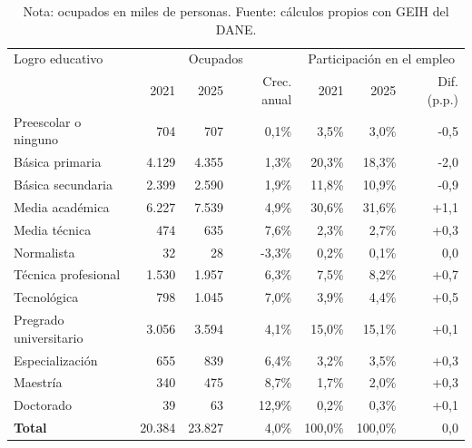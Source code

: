 \begin{table}[H]
\centering
\caption{Ocupación por logro educativo detallado, 2021 y 2025}
\label{tab:ocupacion_educacion_detallada}
\scriptsize
\setlength{\tabcolsep}{3pt}
\begin{tabular}{@{}p{3.7cm}rrrrrr@{}}
\toprule
Logro educativo & \multicolumn{3}{c}{Ocupados} & \multicolumn{3}{c}{Participación en el empleo} \\
 & 2021 & 2025 & Crec. anual & 2021 & 2025 & Dif. (p.p.) \\
\midrule
Preescolar o ninguno & 704 & 707 & 0,1\% & 3,5\% & 3,0\% & -0,5 \\
Básica primaria & 4.129 & 4.355 & 1,3\% & 20,3\% & 18,3\% & -2,0 \\
Básica secundaria & 2.399 & 2.590 & 1,9\% & 11,8\% & 10,9\% & -0,9 \\
Media académica & 6.227 & 7.539 & 4,9\% & 30,6\% & 31,6\% & +1,1 \\
Media técnica & 474 & 635 & 7,6\% & 2,3\% & 2,7\% & +0,3 \\
Normalista & 32 & 28 & -3,3\% & 0,2\% & 0,1\% & 0,0 \\
Técnica profesional & 1.530 & 1.957 & 6,3\% & 7,5\% & 8,2\% & +0,7 \\
Tecnológica & 798 & 1.045 & 7,0\% & 3,9\% & 4,4\% & +0,5 \\
Pregrado universitario & 3.056 & 3.594 & 4,1\% & 15,0\% & 15,1\% & +0,1 \\
Especialización & 655 & 839 & 6,4\% & 3,2\% & 3,5\% & +0,3 \\
Maestría & 340 & 475 & 8,7\% & 1,7\% & 2,0\% & +0,3 \\
Doctorado & 39 & 63 & 12,9\% & 0,2\% & 0,3\% & +0,1 \\
\midrule
\textbf{Total} & 20.384 & 23.827 & 4,0\% & 100,0\% & 100,0\% & 0,0 \\
\bottomrule
\end{tabular}
\caption*{\footnotesize Nota: ocupados en miles de personas. %
Fuente: cálculos propios con GEIH del DANE.}
\end{table}
